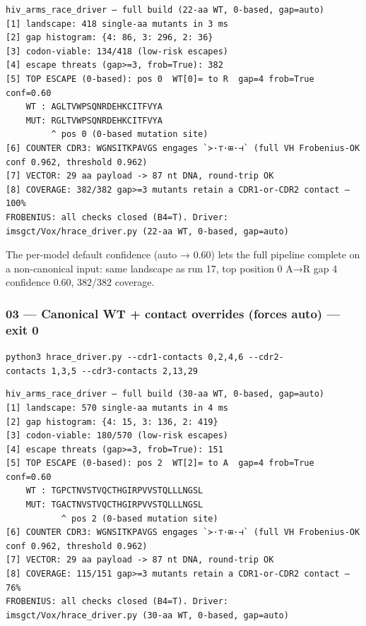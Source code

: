 \begin{verbatim}
hiv_arms_race_driver — full build (22-aa WT, 0-based, gap=auto)
[1] landscape: 418 single-aa mutants in 3 ms
[2] gap histogram: {4: 86, 3: 296, 2: 36}
[3] codon-viable: 134/418 (low-risk escapes)
[4] escape threats (gap>=3, frob=True): 382
[5] TOP ESCAPE (0-based): pos 0  WT[0]= to R  gap=4 frob=True conf=0.60
    WT : AGLTVWPSQNRDEHKCITFVYA
    MUT: RGLTVWPSQNRDEHKCITFVYA
         ^ pos 0 (0-based mutation site)
[6] COUNTER CDR3: WGNSITKPAVGS engages `≻·⊤·⊞·⊣` (full VH Frobenius-OK conf 0.962, threshold 0.962)
[7] VECTOR: 29 aa payload -> 87 nt DNA, round-trip OK
[8] COVERAGE: 382/382 gap>=3 mutants retain a CDR1-or-CDR2 contact — 100%
FROBENIUS: all checks closed (B4=T). Driver: imsgct/Vox/hrace_driver.py (22-aa WT, 0-based, gap=auto)
\end{verbatim}

The per-model default confidence (auto → 0.60) lets the full pipeline
complete on a non-canonical input: same landscape as run 17, top
position 0 A→R gap 4 confidence 0.60, 382/382 coverage.

\hypertarget{canonical-wt-contact-overrides-forces-auto-exit-0}{%
\subsubsection{03 --- Canonical WT + contact overrides (forces auto) ---
exit 0}\label{canonical-wt-contact-overrides-forces-auto-exit-0}}

\texttt{python3\ hrace\_driver.py\ -\/-cdr1-contacts\ 0,2,4,6\ -\/-cdr2-contacts\ 1,3,5\ -\/-cdr3-contacts\ 2,13,29}

\begin{verbatim}
hiv_arms_race_driver — full build (30-aa WT, 0-based, gap=auto)
[1] landscape: 570 single-aa mutants in 4 ms
[2] gap histogram: {4: 15, 3: 136, 2: 419}
[3] codon-viable: 180/570 (low-risk escapes)
[4] escape threats (gap>=3, frob=True): 151
[5] TOP ESCAPE (0-based): pos 2  WT[2]= to A  gap=4 frob=True conf=0.60
    WT : TGPCTNVSTVQCTHGIRPVVSTQLLLNGSL
    MUT: TGACTNVSTVQCTHGIRPVVSTQLLLNGSL
           ^ pos 2 (0-based mutation site)
[6] COUNTER CDR3: WGNSITKPAVGS engages `≻·⊤·⊞·⊣` (full VH Frobenius-OK conf 0.962, threshold 0.962)
[7] VECTOR: 29 aa payload -> 87 nt DNA, round-trip OK
[8] COVERAGE: 115/151 gap>=3 mutants retain a CDR1-or-CDR2 contact — 76%
FROBENIUS: all checks closed (B4=T). Driver: imsgct/Vox/hrace_driver.py (30-aa WT, 0-based, gap=auto)
\end{verbatim}

